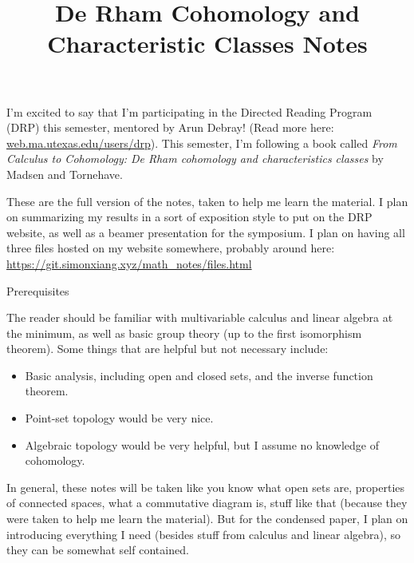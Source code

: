 \documentclass[fontsize=9pt]{article}
\title{De Rham Cohomology and Characteristic Classes Notes}
\begin{document}
\maketitle
I'm excited to say that I'm participating in the Directed Reading Program (DRP) this semester, mentored by Arun Debray! (Read more here: \url{web.ma.utexas.edu/users/drp}). This semester, I'm following a book called \emph{From Calculus to Cohomology: De Rham cohomology and characteristics classes} by Madsen and Tornehave. 

These are the full version of the notes, taken to help me learn the material. I plan on summarizing my results in a sort of exposition style to put on the DRP website, as well as a beamer presentation for the symposium. I plan on having all three files hosted on my website somewhere, probably around here: \url{https://git.simonxiang.xyz/math_notes/files.html}

\begin{center}
    \large\sc Prerequisites
\end{center}
The reader should be familiar with multivariable calculus and linear algebra at the minimum, as well as basic group theory (up to the first isomorphism theorem). Some things that are helpful but not necessary include:
\begin{itemize}
    \setlength\itemsep{-0.2em}
    \item Basic analysis, including open and closed sets, and the inverse function theorem.
    \item Point-set topology would be very nice.
    \item Algebraic topology would be very helpful, but I assume no knowledge of cohomology. 
\end{itemize}
In general, these notes will be taken like you know what open sets are, properties of connected spaces, what a commutative diagram is, stuff like that (because they were taken to help me learn the material). But for the condensed paper, I plan on introducing everything I need (besides stuff from calculus and linear algebra), so they can be somewhat self contained.
\tableofcontents
    
    
    
\end{document}
